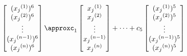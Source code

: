 \documentclass[preview]{standalone}
\begin{document}
\begin{align*}
\special{dvisvgm:raw <g id='unique000'>}\begin{bmatrix}({x_j}^{(1)})^6\\({x_j}^{(2)})^6\\\vdots\\({x_j}^{(n-1)})^6\\({x_j}^{(n)})^6\end{bmatrix}\approxc_1\begin{bmatrix}{x_j}^{(1)}\\{x_j}^{(2)}\\\vdots\\{x_j}^{(n-1)}\\{x_j}^{(n)}\end{bmatrix}+\cdots+c_5\begin{bmatrix}({x_j}^{(1)})^5\\({x_j}^{(2)})^5\\\vdots\\({x_j}^{(n-1)})^5\\({x_j}^{(n)})^5\end{bmatrix}\special{dvisvgm:raw </g>}
\end{align*}
\end{document}
